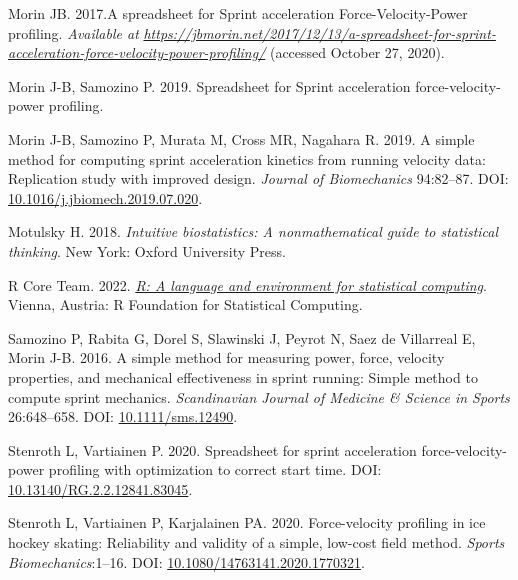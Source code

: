 \documentclass[fleqn,10pt]{wlpeerj} %
\newlength{\cslhangindent}
\newlength{\cslentryspacingunit} %
\newenvironment{CSLReferences}[2] %
 {%
  \setlength{\parindent}{0pt}
  \ifodd #1
  \let\oldpar\par
  \def\par{\hangindent=\cslhangindent\oldpar}
  \fi
  \setlength{\parskip}{#2\cslentryspacingunit}
 }%
 {}
\begin{document}
\begin{CSLReferences}{1}{0}
\leavevmode{}%
Morin JB. 2017.A spreadsheet for {Sprint} acceleration {Force}-{Velocity}-{Power} profiling. \emph{Available at} \href{https://jbmorin.net/2017/12/13/a-spreadsheet-for-sprint-acceleration-force-velocity-power-profiling/}{\emph{https://jbmorin.net/2017/12/13/a-spreadsheet-for-sprint-acceleration-force-velocity-power-profiling/}} (accessed October 27, 2020).

\leavevmode{}%
Morin J-B, Samozino P. 2019. Spreadsheet for {Sprint} acceleration force-velocity-power profiling.

\leavevmode{}%
Morin J-B, Samozino P, Murata M, Cross MR, Nagahara R. 2019. A simple method for computing sprint acceleration kinetics from running velocity data: {Replication} study with improved design. \emph{Journal of Biomechanics} 94:82--87. DOI: \href{https://doi.org/10.1016/j.jbiomech.2019.07.020}{10.1016/j.jbiomech.2019.07.020}.

\leavevmode{}%
Motulsky H. 2018. \emph{Intuitive biostatistics: A nonmathematical guide to statistical thinking}. {New York}: {Oxford University Press}.

\leavevmode{}%
R Core Team. 2022. \emph{\href{https://www.R-project.org/}{R: A language and environment for statistical computing}}. Vienna, Austria: R Foundation for Statistical Computing.

\leavevmode{}%
Samozino P, Rabita G, Dorel S, Slawinski J, Peyrot N, Saez de Villarreal E, Morin J-B. 2016. A simple method for measuring power, force, velocity properties, and mechanical effectiveness in sprint running: {Simple} method to compute sprint mechanics. \emph{Scandinavian Journal of Medicine \& Science in Sports} 26:648--658. DOI: \href{https://doi.org/10.1111/sms.12490}{10.1111/sms.12490}.

\leavevmode{}%
Stenroth L, Vartiainen P. 2020. Spreadsheet for sprint acceleration force-velocity-power profiling with optimization to correct start time. DOI: \href{https://doi.org/10.13140/RG.2.2.12841.83045}{10.13140/RG.2.2.12841.83045}.

\leavevmode{}%
Stenroth L, Vartiainen P, Karjalainen PA. 2020. Force-velocity profiling in ice hockey skating: Reliability and validity of a simple, low-cost field method. \emph{Sports Biomechanics}:1--16. DOI: \href{https://doi.org/10.1080/14763141.2020.1770321}{10.1080/14763141.2020.1770321}.


\end{CSLReferences}
\end{document}
